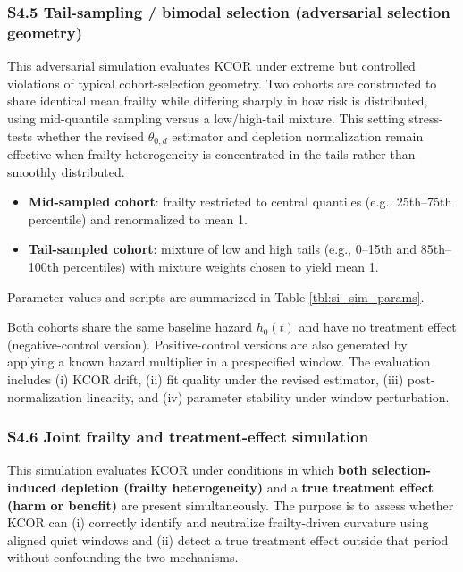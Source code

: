 \documentclass[
]{article}
\providecommand{\tightlist}{%
  \setlength{\itemsep}{0pt}\setlength{\parskip}{0pt}}
\begin{document}
\subsubsection{S4.5 Tail-sampling / bimodal selection (adversarial
selection
geometry)}\label{s4.5-tail-sampling-bimodal-selection-adversarial-selection-geometry}

This adversarial simulation evaluates KCOR under extreme but controlled
violations of typical cohort-selection geometry. Two cohorts are
constructed to share identical mean frailty while differing sharply in
how risk is distributed, using mid-quantile sampling versus a
low/high-tail mixture. This setting stress-tests whether the revised
\(\theta_{0,d}\) estimator and depletion normalization remain effective
when frailty heterogeneity is concentrated in the tails rather than
smoothly distributed.

\begin{itemize}
\tightlist
\item
  \textbf{Mid-sampled cohort}: frailty restricted to central quantiles
  (e.g., 25th--75th percentile) and renormalized to mean 1.
\item
  \textbf{Tail-sampled cohort}: mixture of low and high tails (e.g.,
  0--15th and 85th--100th percentiles) with mixture weights chosen to
  yield mean 1.
\end{itemize}

Parameter values and scripts are summarized in Table
\ref{tbl:si_sim_params}.

Both cohorts share the same baseline hazard \(h_0(t)\) and have no
treatment effect (negative-control version). Positive-control versions
are also generated by applying a known hazard multiplier in a
prespecified window. The evaluation includes (i) KCOR drift, (ii) fit
quality under the revised estimator, (iii) post-normalization linearity,
and (iv) parameter stability under window perturbation.

\subsubsection{S4.6 Joint frailty and treatment-effect
simulation}\label{s4.6-joint-frailty-and-treatment-effect-simulation}

This simulation evaluates KCOR under conditions in which \textbf{both
selection-induced depletion (frailty heterogeneity)} and a \textbf{true
treatment effect (harm or benefit)} are present simultaneously. The
purpose is to assess whether KCOR can (i) correctly identify and
neutralize frailty-driven curvature using aligned quiet windows and (ii)
detect a true treatment effect outside that period without confounding
the two mechanisms.
\end{document}
